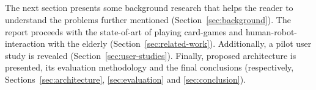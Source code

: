 \subsection*{\centering*}

The next section presents some background research that helps the reader to understand the problems further mentioned (Section~\ref{sec:background}).
The report proceeds with the state-of-art of playing card-games and human-robot-interaction with the elderly (Section~\ref{sec:related-work}).
Additionally, a pilot user study is revealed (Section~\ref{sec:user-studies}).
Finally, proposed architecture is presented, its evaluation methodology and the final conclusions (respectively, Sections~\ref{sec:architecture}, \ref{sec:evaluation} and \ref{sec:conclusion}).


